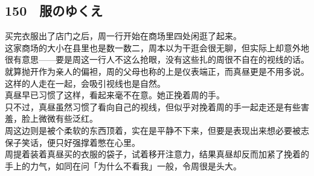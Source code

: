 \subsection{150　服のゆくえ}

买完衣服出了店门之后，周一行开始在商场里四处闲逛了起来。\\

这家商场的大小在县里也是数一数二，周本以为干逛会很无聊，但实际上却意外地很有意思——要是周这一行人不这么抢眼，没有这些扎的周很不自在的视线的话。\\

就算抛开作为亲人的偏袒，周的父母也称的上是仪表端正，而真昼更是不用多说。这样的人走在一起，会吸引视线也是自然。\\

真昼早已习惯了这样，看起来毫不在意。她正挽着周的手。\\

只不过，真昼虽然习惯了看向自己的视线，但似乎对挽着周的手一起走还是有些害羞，脸上微微有些泛红。\\

周这边则是被个柔软的东西顶着，实在是平静不下来，但要是表现出来想必要被志保子笑话，便只好强撑着憋在心里。\\

周提着装着真昼买的衣服的袋子，试着移开注意力，结果真昼却反而加紧了挽着的手上的力气，如同在问「为什么不看我」一般，令周很是头大。\\

